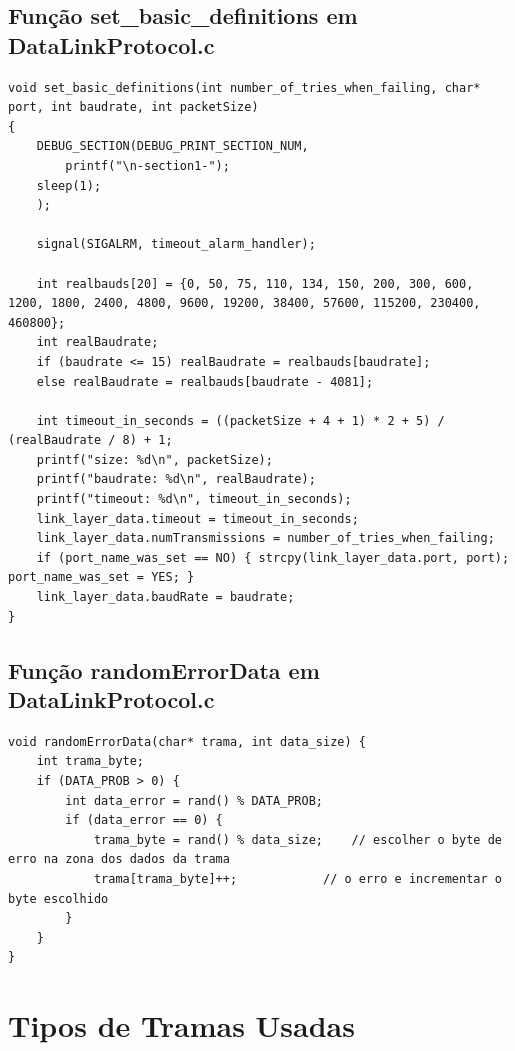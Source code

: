 \documentclass[11pt,a4paper,reqno]{report}
\numberwithin{equation}{section}
\begin{document}
\begin{appendices}
\section{Função set\_basic\_definitions em DataLinkProtocol.c}
\label{setbasicdefinitions}
\begin{lstlisting}
void set_basic_definitions(int number_of_tries_when_failing, char* port, int baudrate, int packetSize)
{
	DEBUG_SECTION(DEBUG_PRINT_SECTION_NUM,
		printf("\n-section1-");
	sleep(1);
	);

	signal(SIGALRM, timeout_alarm_handler);
	
	int realbauds[20] = {0, 50, 75, 110, 134, 150, 200, 300, 600, 1200, 1800, 2400, 4800, 9600, 19200, 38400, 57600, 115200, 230400, 460800};
	int realBaudrate;
	if (baudrate <= 15) realBaudrate = realbauds[baudrate];
	else realBaudrate = realbauds[baudrate - 4081];
	
	int timeout_in_seconds = ((packetSize + 4 + 1) * 2 + 5) / (realBaudrate / 8) + 1;
	printf("size: %d\n", packetSize);
	printf("baudrate: %d\n", realBaudrate);
	printf("timeout: %d\n", timeout_in_seconds);
	link_layer_data.timeout = timeout_in_seconds;
	link_layer_data.numTransmissions = number_of_tries_when_failing;
	if (port_name_was_set == NO) { strcpy(link_layer_data.port, port); port_name_was_set = YES; }
	link_layer_data.baudRate = baudrate;
}
\end{lstlisting}

\section{Função randomErrorData em DataLinkProtocol.c }
\label{randomErrorData}
\begin{lstlisting}
void randomErrorData(char* trama, int data_size) {	
	int trama_byte;
	if (DATA_PROB > 0) {
		int data_error = rand() % DATA_PROB;
		if (data_error == 0) {
			trama_byte = rand() % data_size;	// escolher o byte de erro na zona dos dados da trama
			trama[trama_byte]++;			// o erro e incrementar o byte escolhido
		}
	}
}
\end{lstlisting}




\chapter{Tipos de Tramas Usadas}
\label{tramas}


\end{appendices}
\end{document}
